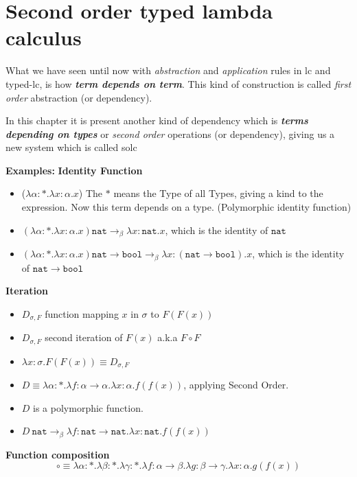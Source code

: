 \documentclass[12pt, a4paper]{article}
\newcommand{\onebeta}{\to_\beta}
\begin{document}
\section{Second order typed lambda calculus}
What we have seen until now with \textit{abstraction} and \textit{application} rules in \acrshort{lc} and typed-\acrshort{lc},
is how \textbf{\textit{term depends on term}}. This kind of construction is called \textit{first order} abstraction (or dependency).

In this chapter it is present another kind of dependency which is \textbf{\textit{terms depending on types}} or \textit{second order} operations (or dependency), 
giving us a new system which is called \acrfull{solc}

\textbf{Examples:}
\textbf{Identity Function}
\begin{itemize}
    \item ($\lambda \alpha : * . \lambda x : \alpha . x$) The $*$ means the Type of all Types, giving a kind to the expression. Now this term depends on a type. (Polymorphic identity function)
    \item $(\lambda \alpha : * . \lambda x : \alpha . x)\mathtt{nat} \onebeta \lambda x : \mathtt{nat} . x$, which is the identity of $\mathtt{nat}$
    \item $(\lambda \alpha : * . \lambda x : \alpha . x)\mathtt{nat \to bool} \onebeta \lambda x : (\mathtt{nat \to bool}) . x$, which is the identity of $\mathtt{nat \to bool}$
\end{itemize}

\textbf{Iteration}
\begin{itemize}
    \item $D_{\sigma,F}$ function mapping $x$ in $\sigma$ to $F(F(x))$
    \item $D_{\sigma,F}$ second iteration of $F(x)$ a.k.a $F \circ F$
    \item $\lambda x : \sigma. F(F(x)) \equiv D_{\sigma,F}$
    \item $D \equiv \lambda \alpha : *. \lambda f : \alpha \to \alpha. \lambda x : \alpha. f(f(x))$, applying Second Order.
    \item $D$ is a polymorphic function.
    \item $D\ \mathtt{nat} \onebeta \lambda f : \mathtt{nat \to nat}. \lambda x : \mathtt{nat}. f(f(x))$
\end{itemize}

\textbf{Function composition}
\begin{equation}
    \circ \equiv \lambda \alpha : *. \lambda \beta : *. \lambda \gamma : * . \lambda f : \alpha \to \beta . \lambda g : \beta \to \gamma. \lambda x : \alpha . g(f(x))
\end{equation}
\end{document}
